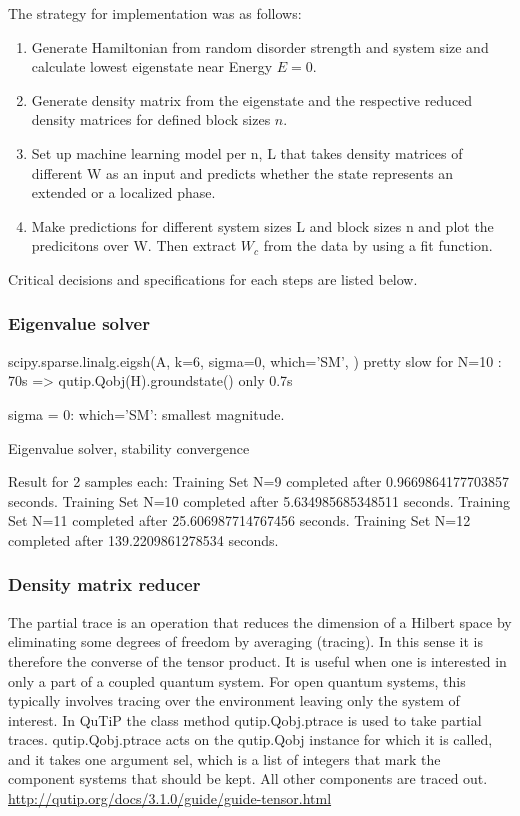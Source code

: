 \documentclass[reprint,amsmath,amssymb,aps,prb]{revtex4-2}
\begin{document}
The strategy for implementation was as follows:

\begin{enumerate}
	\item Generate Hamiltonian from random disorder strength and system size and calculate lowest eigenstate near Energy $E = 0$.
	\item Generate density matrix from the eigenstate and the respective reduced density matrices for defined block sizes $n$.
	\item  Set up machine learning model per n, L that takes density matrices of different W as an input and predicts whether the state represents an extended or a localized phase.
	\item Make predictions for different system sizes L and block sizes n and plot the predicitons over W. Then extract $W_c$	from the data by using a fit function.
\end{enumerate}

Critical decisions and specifications for each steps are listed below.

\subsubsection{Eigenvalue solver}

scipy.sparse.linalg.eigsh(A, k=6, sigma=0, which='SM', ) pretty slow for N=10 : 70s
=> qutip.Qobj(H).groundstate() only 0.7s

sigma = 0:%
which='SM': smallest magnitude.

Eigenvalue solver, stability convergence

Result for 2 samples each:
Training Set N=9 completed after 0.9669864177703857 seconds.
Training Set N=10 completed after 5.634985685348511 seconds.
Training Set N=11 completed after 25.606987714767456 seconds.
Training Set N=12 completed after 139.2209861278534 seconds.

\subsubsection{Density matrix reducer}

The partial trace is an operation that reduces the dimension of a Hilbert space by eliminating some degrees of freedom by averaging (tracing). In this sense it is therefore the converse of the tensor product. It is useful when one is interested in only a part of a coupled quantum system. For open quantum systems, this typically involves tracing over the environment leaving only the system of interest. In QuTiP the class method qutip.Qobj.ptrace is used to take partial traces. qutip.Qobj.ptrace acts on the qutip.Qobj instance for which it is called, and it takes one argument sel, which is a list of integers that mark the component systems that should be kept. All other components are traced out.
\url{http://qutip.org/docs/3.1.0/guide/guide-tensor.html}
\end{document}
